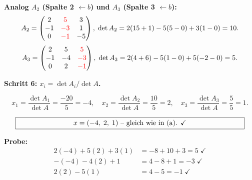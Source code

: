\documentclass[a4paper,12pt]{article}
\begin{document}
\textbf{Analog $A_2$ (Spalte 2 $\leftarrow b$) und $A_3$ (Spalte 3 $\leftarrow b$):}
\[
A_2 = \begin{pmatrix} 2 & \color{red}5 & 3 \\ -1 & \color{red}{-3} & 1 \\ 0 & \color{red}{-1} & -5 \end{pmatrix},\;
\det A_2 = 2(15 + 1) - 5(5 - 0) + 3(1 - 0) = 10.
\]
\[
A_3 = \begin{pmatrix} 2 & 5 & \color{red}5 \\ -1 & -4 & \color{red}{-3} \\ 0 & 2 & \color{red}{-1} \end{pmatrix},\;
\det A_3 = 2(4 + 6) - 5(1 - 0) + 5(-2 - 0) = 5.
\]

\textbf{Schritt 6: $x_i = \det A_i / \det A$.}

\[
x_1 = \frac{\det A_1}{\det A} = \frac{-20}{5} = -4, \quad
x_2 = \frac{\det A_2}{\det A} = \frac{10}{5} = 2, \quad
x_3 = \frac{\det A_3}{\det A} = \frac{5}{5} = 1.
\]

\[
\fbox{\parbox{0.93\textwidth}{\centering
$x = (-4,\; 2,\; 1)$ -- gleich wie in (a). $\checkmark$
}}
\]

\textbf{Probe:}
\begin{align*}
2(-4) + 5(2) + 3(1) &= -8 + 10 + 3 = 5 \;\checkmark \\
-(-4) - 4(2) + 1 &= 4 - 8 + 1 = -3 \;\checkmark \\
2(2) - 5(1) &= 4 - 5 = -1 \;\checkmark
\end{align*}
\end{document}
